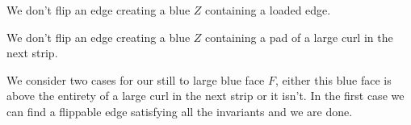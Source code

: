 \begin{invariants}
  \label{inv:uni:rest}
  \item We don't flip an edge creating a blue $Z$ containing a loaded edge.
  \label{inv:uni:noLoad}
  \item We don't flip an edge creating a blue $Z$ containing a pad of a large curl in the next
   strip.
  \label{inv:uni:noPad}
\end{invariants}


We consider two cases for our still to large blue face $F$, either this blue face is above the entirety of a large curl in the next strip or it isn't.
In the first case we can find a flippable edge satisfying all the invariants and we are done.

